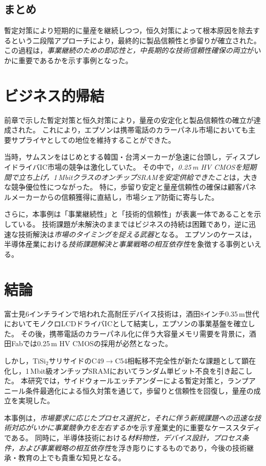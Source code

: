 \documentclass[conference]{IEEEtran}
\begin{document}
\subsection{まとめ}
暫定対策により短期的に量産を継続しつつ，恒久対策によって根本原因を除去するという二段階アプローチにより，最終的に製品信頼性と歩留りが確立された。  
この過程は，\emph{事業継続のための即応性と，中長期的な技術信頼性確保の両立}がいかに重要であるかを示す事例となった。

\section{ビジネス的帰結}
前章で示した暫定対策と恒久対策により，量産の安定化と製品信頼性の確立が達成された。  
これにより，エプソンは携帯電話のカラーパネル市場においても主要サプライヤとしての地位を維持することができた。  

当時，サムスンをはじめとする韓国・台湾メーカーが急速に台頭し，ディスプレイドライバIC市場の競争は激化していた。  
その中で，\emph{0.25\,\textmu m HV CMOSを短期間で立ち上げ，1\,MbitクラスのオンチップSRAMを安定供給できたこと}は，大きな競争優位性につながった。  
特に，歩留り安定と量産信頼性の確保は顧客パネルメーカーからの信頼獲得に直結し，市場シェア防衛に寄与した。  

さらに，本事例は「事業継続性」と「技術的信頼性」が表裏一体であることを示している。  
技術課題が未解決のままではビジネスの持続は困難であり，逆に迅速な技術解決は\emph{市場のタイミングを捉える武器}となる。  
エプソンのケースは，半導体産業における\emph{技術課題解決と事業戦略の相互依存性}を象徴する事例といえる。

\section{結論}
富士見6インチラインで培われた高耐圧デバイス技術は，酒田8インチ0.35\,\textmu m世代においてモノクロLCDドライバICとして結実し，エプソンの事業基盤を確立した。  
その後，携帯電話のカラーパネル化に伴う大容量メモリ需要を背景に，酒田Fabでは0.25\,\textmu m HV CMOSの採用が必然となった。  

しかし，TiSi$_2$サリサイドのC49$\to$C54相転移不完全性が新たな課題として顕在化し，1\,Mbit級オンチップSRAMにおいてランダム単ビット不良を引き起こした。  
本研究では，サイドウォールエッチアンダーによる暫定対策と，ランプアニール条件最適化による恒久対策を通じて，歩留りと信頼性を回復し，量産の成立を実現した。  

本事例は，\emph{市場要求に応じたプロセス選択と，それに伴う新規課題への迅速な技術対応がいかに事業競争力を左右するか}を示す産業史的に重要なケーススタディである。  
同時に，半導体技術における\emph{材料物性，デバイス設計，プロセス条件，および事業戦略の相互依存性}を浮き彫りにするものであり，今後の技術継承・教育の上でも貴重な知見となる。  
\end{document}
